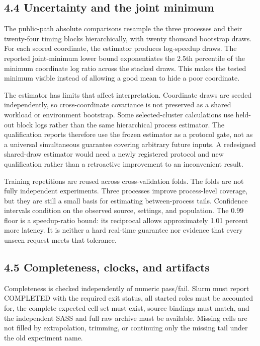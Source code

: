 \documentclass[11pt,a4paper]{article}
\begin{document}
\subsection*{4.4 Uncertainty and the joint minimum}

The public-path absolute comparisons resample the three processes and their twenty-four timing blocks hierarchically, with twenty thousand bootstrap draws. For each scored coordinate, the estimator produces log-speedup draws. The reported joint-minimum lower bound exponentiates the 2.5th percentile of the minimum coordinate log ratio across the stacked draws. This makes the tested minimum visible instead of allowing a good mean to hide a poor coordinate.


The estimator has limits that affect interpretation. Coordinate draws are seeded independently, so cross-coordinate covariance is not preserved as a shared workload or environment bootstrap. Some selected-cluster calculations use held-out block logs rather than the same hierarchical process estimator. The qualification reports therefore use the frozen estimator as a protocol gate, not as a universal simultaneous guarantee covering arbitrary future inputs. A redesigned shared-draw estimator would need a newly registered protocol and new qualification rather than a retroactive improvement to an inconvenient result.


Training repetitions are reused across cross-validation folds. The folds are not fully independent experiments. Three processes improve process-level coverage, but they are still a small basis for estimating between-process tails. Confidence intervals condition on the observed source, settings, and population. The 0.99 floor is a speedup-ratio bound: its reciprocal allows approximately 1.01 percent more latency. It is neither a hard real-time guarantee nor evidence that every unseen request meets that tolerance.


\subsection*{4.5 Completeness, clocks, and artifacts}

Completeness is checked independently of numeric pass/\allowbreak{}fail. Slurm must report COMPLETED with the required exit status, all started roles must be accounted for, the complete expected cell set must exist, source bindings must match, and the independent SASS and full raw archive must be available. Missing cells are not filled by extrapolation, trimming, or continuing only the missing tail under the old experiment name.
\end{document}
